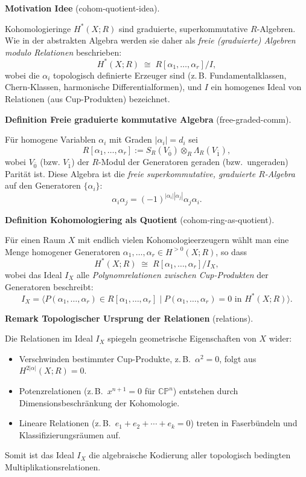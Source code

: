 \documentclass[10pt, letterpaper]{article}
\newcommand{\CustomHeading}[3]{%
  \par\medskip\noindent%
  \textbf{#1 #2} \textnormal{(#3)}.\enskip%
}
\newenvironment{DEF}[2]{\begin{unitbox}\CustomHeading{Definition}{#1}{#2}}{\end{unitbox}}
\newenvironment{REM}[2]{\begin{unitbox}\CustomHeading{Remark}{#1}{#2}}{\end{unitbox}}
\newenvironment{MOT}[2]{\begin{unitbox}\CustomHeading{Motivation}{#1}{#2}}{\end{unitbox}}
\begin{document}
\begin{MOT}{Idee}{cohom-quotient-idea}
Kohomologieringe $H^\ast(X;R)$ sind graduierte, superkommutative $R$-Algebren.
Wie in der abstrakten Algebra werden sie daher als
\emph{freie (graduierte) Algebren modulo Relationen} beschrieben:
\[
H^\ast(X;R)\;\cong\;R[\alpha_1,\dots,\alpha_r]/I,
\]
wobei die $\alpha_i$ topologisch definierte Erzeuger sind
(z.\,B. Fundamentalklassen, Chern-Klassen, harmonische Differentialformen),
und $I$ ein homogenes Ideal von Relationen
(aus Cup-Produkten) bezeichnet.
\end{MOT}

\begin{DEF}{Freie graduierte kommutative Algebra}{free-graded-comm}
Für homogene Variablen $\alpha_i$ mit Graden $|\alpha_i|=d_i$
sei
\[
R[\alpha_1,\dots,\alpha_r]
:= S_R(V_{\bar 0})\otimes_R \Lambda_R(V_{\bar 1}),
\]
wobei $V_{\bar 0}$ (bzw. $V_{\bar 1}$)
der $R$-Modul der Generatoren geraden (bzw.\ ungeraden) Parität ist.
Diese Algebra ist die \emph{freie superkommutative, graduierte $R$-Algebra}
auf den Generatoren $\{\alpha_i\}$:
\[
\alpha_i\alpha_j = (-1)^{|\alpha_i||\alpha_j|}\alpha_j\alpha_i.
\]
\end{DEF}

\begin{DEF}{Kohomologiering als Quotient}{cohom-ring-as-quotient}
Für einen Raum $X$ mit endlich vielen Kohomologieerzeugern
wählt man eine Menge homogener Generatoren
$\alpha_1,\dots,\alpha_r\in H^{>0}(X;R)$, so dass
\[
H^\ast(X;R)
\;\cong\;
R[\alpha_1,\dots,\alpha_r]\big/ I_X,
\]
wobei das Ideal $I_X$ alle \emph{Polynomrelationen zwischen Cup-Produkten}
der Generatoren beschreibt:
\[
I_X
=\big\langle
P(\alpha_1,\dots,\alpha_r)\in R[\alpha_1,\dots,\alpha_r]\mid
P(\alpha_1,\dots,\alpha_r)=0\text{ in }H^\ast(X;R)
\big\rangle.
\]
\end{DEF}

\begin{REM}{Topologischer Ursprung der Relationen}{relations}
Die Relationen im Ideal $I_X$ spiegeln geometrische Eigenschaften von $X$ wider:
\begin{itemize}[leftmargin=*]
\item Verschwinden bestimmter Cup-Produkte, z.\,B.\ $\alpha^2=0$,
      folgt aus $H^{2|\alpha|}(X;R)=0$.
\item Potenzrelationen (z.\,B.\ $x^{n+1}=0$ für $\mathbb{CP}^n$)
      entstehen durch Dimensionsbeschränkung der Kohomologie.
\item Lineare Relationen (z.\,B.\ $e_1+e_2+\cdots+e_k=0$)
      treten in Faserbündeln und Klassifizierungsräumen auf.
\end{itemize}
Somit ist das Ideal $I_X$ die algebraische Kodierung
aller topologisch bedingten Multiplikationsrelationen.
\end{REM}
\end{document}
